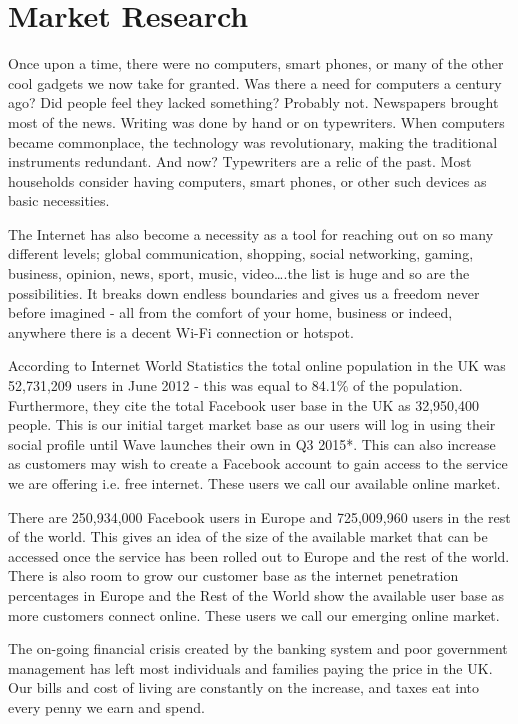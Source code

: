 \documentclass[letterpaper,10pt,openany,oneside,english]{sphinxmanual}
\begin{document}
\section{Market Research}
\label{\detokenize{market-analysis:market-research}}
Once upon a time, there were no computers, smart phones, or many of the other cool gadgets we now take for granted. Was there a need for computers a century ago? Did people feel they lacked something? Probably not. Newspapers brought most of the news. Writing was done by hand or on typewriters. When computers became commonplace, the technology was revolutionary, making the traditional instruments redundant. And now? Typewriters are a relic of the past. Most households consider having computers, smart phones, or other such devices as basic necessities.

The Internet has also become a necessity as a tool for reaching out on so many different levels; global communication, shopping, social networking, gaming, business, opinion, news, sport, music, video….the list is huge and so are the possibilities. It breaks down endless boundaries and gives us a freedom never before imagined - all from the comfort of your home, business or indeed, anywhere there is a decent Wi-Fi connection or hotspot.

According to Internet World Statistics the total online population in the UK was 52,731,209 users in June 2012 - this was equal to 84.1\% of the population. Furthermore, they cite the total Facebook user base in the UK as 32,950,400 people. This is our initial target market base as our users will log in using their social profile until Wave launches their own in Q3 2015*. This can also increase as customers may wish to create a Facebook account to gain access to the service we are offering i.e. free internet. These users we call our available online market.

There are 250,934,000 Facebook users in Europe and 725,009,960 users in the rest of the world. This gives an idea of the size of the available market that can be accessed once the service has been rolled out to Europe and the rest of the world. There is also room to grow our customer base as the internet penetration percentages in Europe and the Rest of the World show the available user base as more customers connect online. These users we call our emerging online market.


The on-going financial crisis created by the banking system and poor government management has left most individuals and families paying the price in the UK. Our bills and cost of living are constantly on the increase, and taxes eat into every penny we earn and spend.
\end{document}
